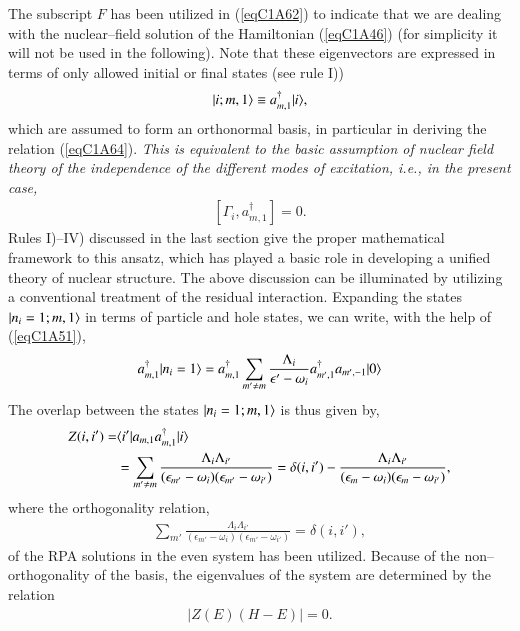  
The subscript $F$ has been utilized in (\ref{eqC1A62}) to indicate that we are dealing with the nuclear--field solution of the Hamiltonian (\ref{eqC1A46}) (for simplicity it will not be used in the following). Note that these eigenvectors are expressed in terms of only  allowed initial or final states (see rule I)) 
\begin{align}\label{eqC1A65} 
 |{i;m,1} \rangle\equiv a^\dagger_{m,1}|{i} \rangle,
  \end{align}
which are assumed to form an orthonormal basis, in particular in deriving the 
relation (\ref{eqC1A64}). \textit{This is equivalent to the basic assumption of  nuclear field theory of the independence of the different modes of excitation, i.e., in the 
present case, }
\begin{align}\label{eqC1A66} 
 [\Gamma_i,a^\dagger_{m,1}]=0.
  \end{align}
Rules I)--IV) discussed in the last section give the proper mathematical framework to this ansatz, which has played a basic role in developing a unified theory of nuclear structure. 
The above discussion can be illuminated by utilizing a conventional treatment of the residual interaction. Expanding the states $|{n_i=1; m,1} \rangle$
in terms of particle and hole states, we can write, with the help of (\ref{eqC1A51}), 
\begin{align}\label{eqC1A66b} 
 a^\dagger_{m,1}|{n_i=1} \rangle=a^\dagger_{m,1}\sum_{m'\neq m}\frac{\Lambda_i}{\epsilon'-\omega_i}a^\dagger_{m',1}a_{m',-1}|{0} \rangle
  \end{align}
The overlap between the states $|{n_i=1; m,1} \rangle$ is thus given by, 
\begin{align}\label{eqC1A67} 
 \nonumber Z(i,i')=&\langle {i'|a_{m,1}a^\dagger_{m,1}|i} \rangle\\
 &=\sum_{m'\neq m}\frac{\Lambda_i\Lambda_{i'}}{(\epsilon_{m'}-\omega_i)(\epsilon_{m'}-\omega_{i'})}=\delta(i,i')-\frac{\Lambda_i\Lambda_{i'}}{(\epsilon_m-\omega_i)(\epsilon_m-\omega_{i'})},
  \end{align}
where the orthogonality relation,
\begin{align}\label{eqC1A68} 
 \sum_{m'}\frac{\Lambda_i\Lambda_{i'}}{(\epsilon_{m'}-\omega_i)(\epsilon_{m'}-\omega_{i'})}=\delta(i,i'),
  \end{align}
of the RPA solutions in the even system has been utilized. Because of the non--orthogonality of the basis, the eigenvalues of the system are determined 
by the relation
\begin{align}\label{eqC1A69} 
 \left|Z(E)(H-E)\right|=0.
  \end{align}
